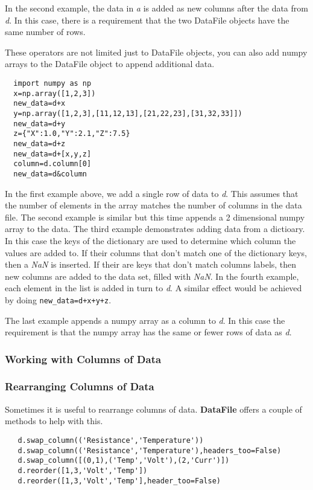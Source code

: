 \documentclass[a4paper,11pt]{scrartcl}
\begin{document}
In the second example, the data in \textit{a} is added as new columns after the
data from \textit{d}. In this case, there is a requirement that the two DataFile
objects have the same number of rows.

These operators are not limited just to DataFile objects, you can also add numpy
arrays to the DataFile object to append additional data.
\begin{lstlisting}
  import numpy as np
  x=np.array([1,2,3])
  new_data=d+x
  y=np.array([1,2,3],[11,12,13],[21,22,23],[31,32,33]])
  new_data=d+y
  z={"X":1.0,"Y":2.1,"Z":7.5}
  new_data=d+z
  new_data=d+[x,y,z]
  column=d.column[0]
  new_data=d&column
\end{lstlisting}
In the first example above, we add a single row of data to \textit{d}. This
assumes that the number of elements in the array matches the number of columns
in the data file. The second example is similar but this time appends a 2
dimensional numpy array to the data. The third example demonstrates adding data from a dictioary. In this case
the keys of the dictionary are used to determine which column the values are added to. If their columns that
don't match one of the dictionary keys, then a \textit{NaN} is inserted. If their are keys that don't match
columns labels, then new columns are added to the data set, filled with \textit{NaN}. In the fourth example, each element
in the list is added in turn to \textit{d}. A similar effect would be achieved by doing \verb#new_data=d+x+y+z#.

The last example appends a numpy array as
a column to \textit{d}. In this case the requirement is that the numpy array has
the same or fewer rows of data as \textit{d}.

\subsubsection{Working with Columns of Data}
\subsubsection{Rearranging Columns of Data}
Sometimes it is useful to rearrange columns of data. \textbf{DataFile} offers a couple of methods to help with this.
\begin{lstlisting}
   d.swap_column(('Resistance','Temperature'))
   d.swap_column(('Resistance','Temperature'),headers_too=False)
   d.swap_column([(0,1),('Temp','Volt'),(2,'Curr')])
   d.reorder([1,3,'Volt','Temp'])
   d.reorder([1,3,'Volt','Temp'],header_too=False)
\end{lstlisting}
\end{document}

